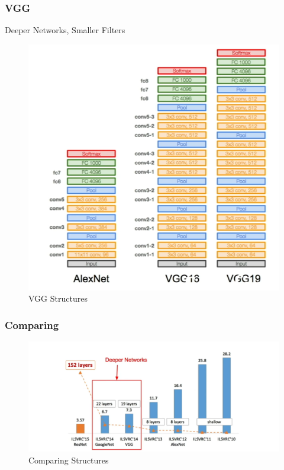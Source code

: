 \documentclass{beamer}
\begin{document}
\begin{frame}
\frametitle{VGG}
{\color{red} Deeper Networks, Smaller Filters}
\begin{figure}
	\includegraphics[width=.6\linewidth]{Pics/VGG.png}
	\caption{VGG Structures}
\end{figure}

\end{frame}
\begin{frame}
\frametitle{Comparing}

\begin{figure}
	\includegraphics[width=\linewidth]{Pics/compare2.png}
	\caption{Comparing Structures}
\end{figure}

\end{frame}
\end{document}
